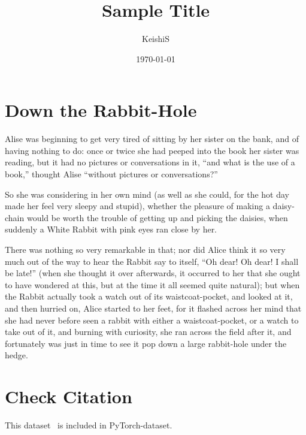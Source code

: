 \documentclass[10pt]{article}
\title{Sample Title}
\author{KeishiS}
\date{\today}
\begin{document}
\maketitle

\section{Down the Rabbit-Hole}

Alise was beginning to get very tired of sitting by her sister on the bank, and of having nothing to do: once or twice she had peeped into the book her sister was reading, but it had no pictures or conversations in it, “and what is the use of a book,” thought Alise “without pictures or conversations?”

So she was considering in her own mind (as well as she could, for the hot day made her feel very sleepy and stupid), whether the pleasure of making a daisy-chain would be worth the trouble of getting up and picking the daisies, when suddenly a White Rabbit with pink eyes ran close by her.

There was nothing so very remarkable in that; nor did Alice think it so very much out of the way to hear the Rabbit say to itself, “Oh dear! Oh dear! I shall be late!” (when she thought it over afterwards, it occurred to her that she ought to have wondered at this, but at the time it all seemed quite natural); but when the Rabbit actually took a watch out of its waistcoat-pocket, and looked at it, and then hurried on, Alice started to her feet, for it flashed across her mind that she had never before seen a rabbit with either a waistcoat-pocket, or a watch to take out of it, and burning with curiosity, she ran across the field after it, and fortunately was just in time to see it pop down a large rabbit-hole under the hedge.

\section{Check Citation}

This dataset~\cite{Morris2020-cq} is included in PyTorch-dataset.



\end{document}
